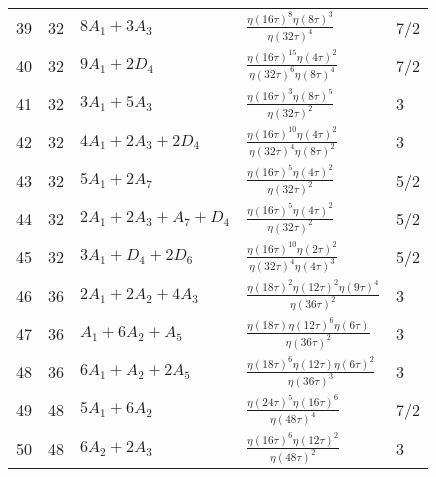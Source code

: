 \documentclass{amsart}
\theoremstyle{definition}
\begin{document}
\begin{longtable}{|l|l|l|l|l|}
  39 & 32 & $8 A_{1} + 3 A_{3}$ & ${\frac {  \eta \left( 16\tau \right)   ^{8}  \eta \left( 8\tau \right)   ^{3}}{  \eta \left( 32\tau \right)   ^{4}}}$ & 7/2 \\ 
  40 & 32 & $9 A_{1} + 2 D_{4}$ & ${\frac {  \eta \left( 16\tau \right)   ^{15}  \eta \left( 4\tau \right)   ^{2}}{  \eta \left( 32\tau \right)   ^{6} \mbox{}  \eta \left( 8\tau \right)   ^{4}}}$ & 7/2 \\ 
  41 & 32 & $3 A_{1} + 5 A_{3}$ & ${\frac {  \eta \left( 16\tau \right)   ^{3}  \eta \left( 8\tau \right)   ^{5}}{  \eta \left( 32\tau \right)   ^{2}}}$ & 3 \\ 
  42 & 32 & $4 A_{1} + 2 A_{3} + 2 D_{4}$ & ${\frac {  \eta \left( 16\tau \right)   ^{10}  \eta \left( 4\tau \right)   ^{2}}{  \eta \left( 32\tau \right)   ^{4} \mbox{}  \eta \left( 8\tau \right)   ^{2}}}$ & 3 \\ 
  43 & 32 & $5 A_{1} + 2 A_{7}$ & ${\frac {  \eta \left( 16\tau \right)   ^{5}  \eta \left( 4\tau \right)   ^{2}}{  \eta \left( 32\tau \right)   ^{2}}}$ & 5/2 \\ 
  44 & 32 & $2 A_{1} + 2 A_{3} +  A_{7} +  D_{4}$ & ${\frac {  \eta \left( 16\tau \right)   ^{5}  \eta \left( 4\tau \right)   ^{2}}{  \eta \left( 32\tau \right)   ^{2}}}$ & 5/2 \\ 
  45 & 32 & $3 A_{1} +  D_{4} + 2 D_{6}$ & ${\frac {  \eta \left( 16\tau \right)   ^{10}  \eta \left( 2\tau \right)   ^{2}}{  \eta \left( 32\tau \right)   ^{4} \mbox{}  \eta \left( 4\tau \right)   ^{3}}}$ & 5/2 \\ 
  46 & 36 & $2 A_{1} + 2 A_{2} + 4 A_{3}$ & ${\frac {  \eta \left( 18\tau \right)   ^{2}  \eta \left( 12\tau \right)   ^{2}  \eta \left( 9\tau \right)   ^{4} \mbox{}}{  \eta \left( 36\tau \right)   ^{2}}}$ & 3 \\ 
  47 & 36 & $ A_{1} + 6 A_{2} +  A_{5}$ & ${\frac {\eta \left( 18\tau \right)   \eta \left( 12\tau \right)   ^{6}\eta \left( 6\tau \right) }{  \eta \left( 36 \mbox{}\tau \right)   ^{2}}}$ & 3 \\ 
  48 & 36 & $6 A_{1} +  A_{2} + 2 A_{5}$ & ${\frac {  \eta \left( 18\tau \right)   ^{6}\eta \left( 12\tau \right)   \eta \left( 6\tau \right)   ^{2}}{  \eta \left( 36 \mbox{}\tau \right)   ^{3}}}$ & 3 \\ 
  49 & 48 & $5 A_{1} + 6 A_{2}$ & ${\frac {  \eta \left( 24\tau \right)   ^{5}  \eta \left( 16\tau \right)   ^{6}}{  \eta \left( 48\tau \right)   ^{4}}}$ & 7/2 \\ 
  50 & 48 & $6 A_{2} + 2 A_{3}$ & ${\frac {  \eta \left( 16\tau \right)   ^{6}  \eta \left( 12\tau \right)   ^{2}}{  \eta \left( 48\tau \right)   ^{2}}}$ & 3 \\ 

\end{longtable}
\end{document}
